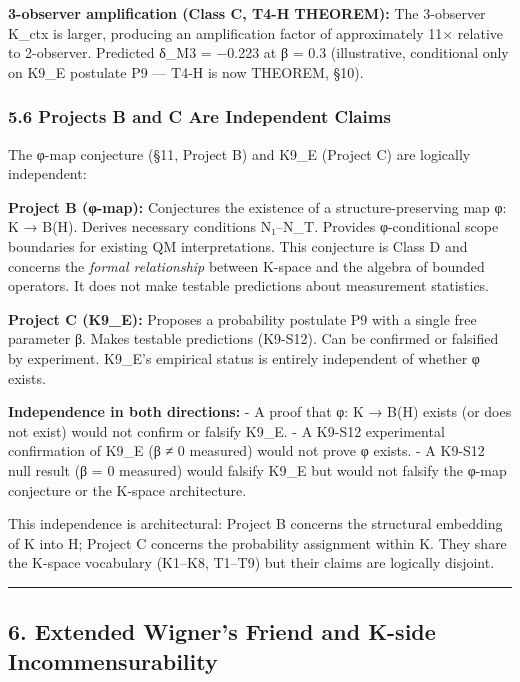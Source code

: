 \documentclass[
  11pt,
]{article}
\begin{document}
\textbf{3-observer amplification (Class C, T4-H THEOREM):} The
3-observer K\_ctx is larger, producing an amplification factor of
approximately 11× relative to 2-observer. Predicted δ\_M3 = −0.223 at β
= 0.3 (illustrative, conditional only on K9\_E postulate P9 --- T4-H is
now THEOREM, §10).

\subsubsection{5.6 Projects B and C Are Independent
Claims}\label{projects-b-and-c-are-independent-claims}

The φ-map conjecture (§11, Project B) and K9\_E (Project C) are
logically independent:

\textbf{Project B (φ-map):} Conjectures the existence of a
structure-preserving map φ: K → B(H). Derives necessary conditions
N₁--N\_T. Provides φ-conditional scope boundaries for existing QM
interpretations. This conjecture is Class D and concerns the
\emph{formal relationship} between K-space and the algebra of bounded
operators. It does not make testable predictions about measurement
statistics.

\textbf{Project C (K9\_E):} Proposes a probability postulate P9 with a
single free parameter β. Makes testable predictions (K9-S12). Can be
confirmed or falsified by experiment. K9\_E's empirical status is
entirely independent of whether φ exists.

\textbf{Independence in both directions:} - A proof that φ: K → B(H)
exists (or does not exist) would not confirm or falsify K9\_E. - A
K9-S12 experimental confirmation of K9\_E (β ≠ 0 measured) would not
prove φ exists. - A K9-S12 null result (β = 0 measured) would falsify
K9\_E but would not falsify the φ-map conjecture or the K-space
architecture.

This independence is architectural: Project B concerns the structural
embedding of K into H; Project C concerns the probability assignment
within K. They share the K-space vocabulary (K1--K8, T1--T9) but their
claims are logically disjoint.

\begin{center}\rule{0.5\linewidth}{0.5pt}\end{center}

\subsection{6. Extended Wigner's Friend and K-side
Incommensurability}\label{extended-wigners-friend-and-k-side-incommensurability}
\end{document}
